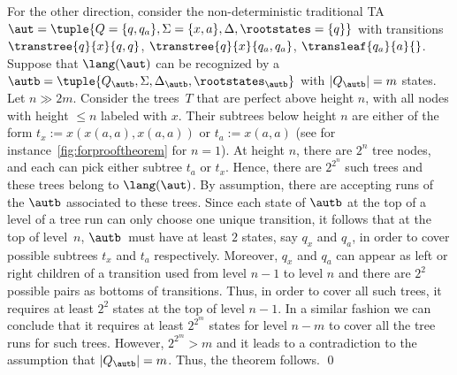  For the other direction, consider the non-deterministic traditional TA $\aut =\tuple{Q=\{q,q_a\} ,\Sigma=\{x,a\} ,\Delta,\rootstates=\{q\}}$ with transitions $\transtree {q}{x}{q,q}$, $\transtree{q}{x}{q_a,q_a}$, $\transleaf{q_a}{a}{}$. 
Suppose that $\lang(\aut)$ can be recognized by a \lsta $\autb=\tuple{Q_\autb,\Sigma,\Delta_\autb,\rootstates_\autb}$ with
    $|Q_\autb|=m$ states. Let $n \gg 2m$. 
    Consider the trees~$T$ that are perfect above height $n$, with all nodes with height $\leq n$ labeled with $x$. Their subtrees below height $n$ are either of the form $t_x:= x(x(a,a),x(a,a))$ or $t_a:=x(a,a)$ (see for instance~\cref{fig:forprooftheorem} for $n=1$). 
    At height $n$, there are $2^n$ tree nodes, and each can pick either subtree $t_a$ or $t_x$.
    Hence, there are $2^{2^n}$ such trees and these trees belong to $\lang(\aut)$. 
    By assumption, there are accepting runs of the \lsta $\autb$ associated to these trees. 
    Since each state of $\autb$ at the top of a level of a tree run can only choose one
    unique transition, it follows that
    at the top of level~$n$, $\autb$~must have at least $2$ states, say $q_x$ and $q_a$, in order to cover possible subtrees $t_x$ and $t_a$ respectively. 
    Moreover, $q_x$ and $q_a$ can appear as left or right children of a transition used from level $n-1$ to level $n$ and there are $2^2$ possible pairs as bottoms of transitions. 
    Thus, in order to cover all such trees, it requires at least $2^2$ states at the top of level $n-1$. In a similar fashion we can conclude that it requires at least $2^{2^m}$ states for level $n-m$ to cover all the tree runs for such trees. 
    However, $2^{2^m} > m$ and it leads to a contradiction to the assumption that $|Q_\autb|=m$. Thus, the theorem follows. %
\qed
    \treesforLSTAngeqTa
    


